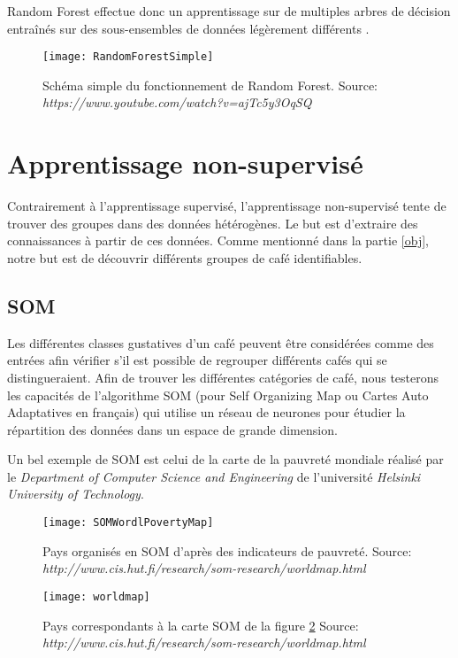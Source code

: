 Random Forest effectue donc un apprentissage sur de multiples arbres de décision entraînés sur des sous-ensembles de données légèrement différents \cite{Statistics01randomforests}.


\begin{figure}[H]
	\texttt{[image: RandomForestSimple]}
	\caption{\label{RandomForestSchema} Schéma simple du fonctionnement de Random Forest. \newline Source: \textit{https://www.youtube.com/watch?v=ajTc5y3OqSQ}}
\end{figure}


\newpage

\section{Apprentissage non-supervisé}
Contrairement à l'apprentissage supervisé, l'apprentissage non-supervisé tente de trouver des groupes dans des données hétérogènes. Le but est d'extraire des connaissances à partir de ces données. Comme mentionné dans la partie \ref{obj}, notre but est de découvrir différents groupes de café identifiables. 


\subsection{SOM}

Les différentes classes gustatives d'un café peuvent être considérées comme des entrées afin vérifier s'il est possible de regrouper différents cafés qui se distingueraient. Afin de trouver les différentes catégories de café, nous testerons les capacités de l'algorithme SOM (pour Self Organizing Map ou Cartes Auto Adaptatives en français) qui utilise un réseau de neurones pour étudier la répartition des données dans un espace de grande dimension. 

Un bel exemple de SOM est celui de la carte de la pauvreté mondiale réalisé par le \textit{Department of Computer Science and Engineering} de l'université \textit{Helsinki University of Technology}. 

\begin{figure}[H]
	\texttt{[image: SOMWordlPovertyMap]}
	\caption{\label{SOMPovertyMap} Pays organisés en SOM d'après des indicateurs de pauvreté. \newline Source: \textit{http://www.cis.hut.fi/research/som-research/worldmap.html}}
\end{figure}

\begin{figure}[H]
	\texttt{[image: worldmap]}
	\caption{\label{WorldPovertyMap} Pays correspondants à la carte SOM de la figure \ref{SOMPovertyMap} \newline Source: \textit{http://www.cis.hut.fi/research/som-research/worldmap.html}}
\end{figure}




